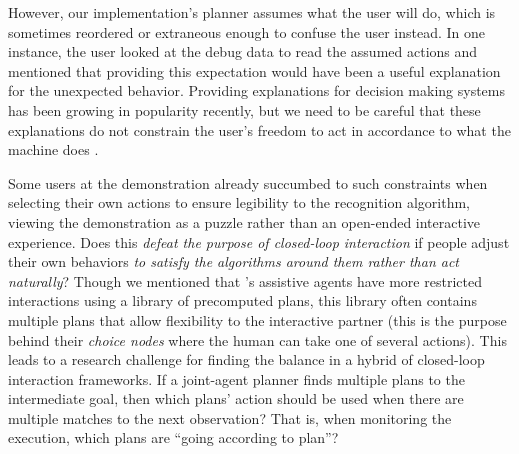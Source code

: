 \documentclass[letterpaper]{article} %
\begin{document}
However, our implementation's planner assumes what the user will do, which is sometimes reordered or extraneous enough to confuse the user instead.  In one instance, the user looked at the debug data to read the assumed actions and mentioned that providing this expectation would have been a useful explanation for the unexpected behavior.  Providing explanations for decision making systems \cite{xaip} has been growing in popularity recently, but we need to be careful that these explanations do not constrain the user's freedom to act in accordance to what the machine does \cite{DBLP:conf/aaaifs/CastroRMB17}.

Some users at the demonstration already succumbed to such constraints when selecting their own actions to ensure legibility to the recognition algorithm, viewing the demonstration as a puzzle rather than an open-ended interactive experience.  Does this \textit{defeat the purpose of closed-loop interaction} if people adjust their own behaviors \textit{to satisfy the algorithms around them rather than act naturally}?  Though we mentioned that \citeauthor{jair_levineWilliams}'s  assistive agents have more restricted interactions using %
 a library of precomputed plans, this library often contains multiple plans that allow flexibility to the interactive partner (this is the purpose behind their \textit{choice nodes} where the human can take one of several actions).  This leads to a research challenge for finding the balance in a hybrid of closed-loop interaction frameworks.  If a joint-agent planner finds multiple plans to the intermediate goal, then which plans' action should be used when there are multiple matches to the next observation?  That is, when monitoring the execution, which plans are ``going according to plan''?




\vspace{-13.5pt}
\end{document}
